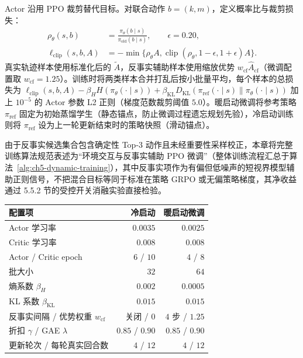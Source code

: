 Actor 沿用 PPO 裁剪替代目标\cite{schulman2017proximal}。对联合动作 $b=(k,m)$，定义概率比与裁剪损失：
\begin{equation}
 \begin{aligned}
 \rho_\theta(s,b)&=\frac{\pi_\theta(b\mid s)}{\pi_{\mathrm{old}}(b\mid s)},\qquad\epsilon=0.20,\\
 \ell_{\mathrm{clip}}(s,b,A)&=-\min\{\rho_\theta A,
 \operatorname{clip}(\rho_\theta,1-\epsilon,1+\epsilon)A\}.
 \end{aligned}
 \label{eq:ch5-ppo}
\end{equation}
真实轨迹样本使用标准化后的 $\widetilde A$，反事实辅助样本使用缩放优势 $w_{\mathrm{cf}}\widehat A_{\mathrm{cf}}$（微调配置取 $w_{\mathrm{cf}}=1.25$）。训练时将两类样本合并打乱后按小批量平均，每个样本的总损失为 $\ell_{\mathrm{clip}}(s,b,A)-\beta_H H(\pi_\theta(\cdot\mid s))+\beta_{\mathrm{KL}}D_{\mathrm{KL}}(\pi_{\mathrm{ref}}(\cdot\mid s)\|\pi_\theta(\cdot\mid s))$ 加上 $10^{-5}$ 的 Actor 参数 L2 正则（梯度范数裁剪阈值 $5.0$）。暖启动微调将参考策略 $\pi_{\mathrm{ref}}$ 固定为初始蒸馏学生（静态锚点，防止微调过程遗忘规划先验），冷启动训练则将 $\pi_{\mathrm{ref}}$ 设为上一轮更新结束时的策略快照（滑动锚点）。

由于反事实候选集合包含确定性 Top-3 动作且未经重要性采样校正，本章将完整训练算法规范表述为“环境交互与反事实辅助 PPO 微调”（整体训练流程汇总于算法~\ref{alg:ch5-dynamic-training}），其中反事实项作为有偏但低噪声的短视界模型辅助正则信号，不把混合目标等同于标准在策略 GRPO 或无偏策略梯度，其净收益通过 5.5.2 节的受控开关消融实验直接检验。

\begin{table}[!htbp]
\centering
{}
\label{tab:ch5-dynamic-hyper}
\begin{tabular}{lrr}
\toprule
配置项 & 冷启动 & 暖启动微调 \\
\midrule
Actor 学习率 & $0.0035$ & $0.0025$ \\
Critic 学习率 & $0.008$ & $0.008$ \\
Actor / Critic epoch & $6$ / $10$ & $4$ / $8$ \\
批大小 & $32$ & $64$ \\
熵系数 $\beta_H$ & $0.002$ & $0.0005$ \\
KL 系数 $\beta_{\mathrm{KL}}$ & $0.015$ & $0.015$ \\
反事实间隔 / 优势权重 $w_{\mathrm{cf}}$ & 关闭 / $0$ & $4$ 步 / $1.25$ \\
折扣 $\gamma$ / GAE $\lambda$ & $0.85$ / $0.90$ & $0.85$ / $0.90$ \\
更新轮次 / 每轮真实回合数 & $4$ / $12$ & $4$ / $12$ \\
\bottomrule
\end{tabular}
\end{table}

